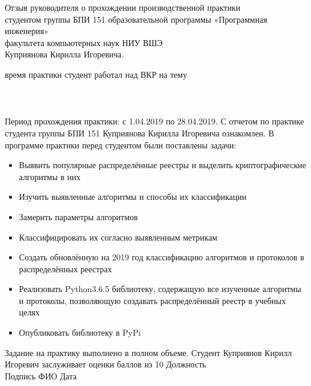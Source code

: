 \documentclass[russian, a4paper, 12pt]{article}
\begin{document}
\thispagestyle{empty}
{\Large
\begin{center}
    Отзыв руководителя о прохождении производственной практики\\
    студентом группы БПИ 151 образовательной программы «Программная инженерия»\\
    факультета компьютерных наук НИУ ВШЭ\\
    Куприянова Кирилла Игоревича.
\end{center}
}

 время практики студент работал над ВКР на тему
\underline{\hspace{7cm}}\\\\
\underline{\hspace{\textwidth}}\\\\
Период прохождения практики: с 1.04.2019 по 28.04.2019.
%
    С отчетом по практике студента группы БПИ 151 Куприянова Кирилла Игоревича ознакомлен.
    В программе практики перед студентом были поставлены задачи:
    \begin{itemize}
        \item Выявить популярные распределённые реестры и выделить криптографические алгоритмы в них
        \item Изучить выявленные алгоритмы и способы их классификации
        \item Замерить параметры алгоритмов
        \item Классифицировать их согласно выявленным метрикам
        \item Создать обновлённую на 2019 год классификацию алгоритмов и
              протоколов в распределённых реестрах
        \item Реализовать Python3.6.5 библиотеку, содержащую все изученные
              алгоритмы и протоколы, позволяющую создавать распределённый реестр
              в учебных целях
        \item Опубликовать библиотеку в PyPi
    \end{itemize}


Задание на практику выполнено в полном объеме. Студент Куприянов Кирилл Игоревич заслуживает оценки
\underline{\hspace{0.7cm}} баллов из 10
\newline
\newline
Должность \underline{\hspace{15cm}}\\
\newline
Подпись \underline{\hspace{6cm}}
ФИО \underline{\hspace{8.3cm}}
\newline
\newline
Дата \underline{\hspace{4cm}}
\end{document}
